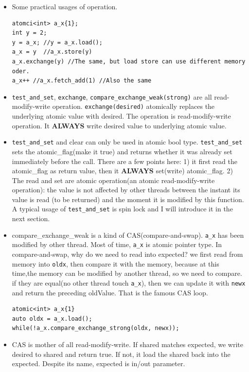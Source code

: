 \documentclass[a4paper,11pt,twoside]{book}
\begin{document}
\begin{itemize}
	\item Some practical usages of operation.
\begin{lstlisting}[numbers=none]
atomci<int> a_x{1};
int y = 2;
y = a_x; //y = a_x.load();
a_x = y  //a_x.store(y) 
a_x.exchange(y) //The same, but load store can use different memory oder.
a_x++ //a_x.fetch_add(1) //Also the same
\end{lstlisting}	

	\item \texttt{test\_and\_set}, \texttt{exchange}, \texttt{compare\_exchange\_weak(strong)} are all read-modify-write operation. \texttt{exchange(desired)} atomically replaces the underlying atomic value with desired. The operation is read-modify-write operation. It \textbf{ALWAYS} write desired value to underlying atomic value. 

	\item \texttt{test\_and\_set} and clear can only be used in atomic bool type.  \texttt{test\_and\_set} sets the atomic\_flag(make it true) and returns whether it was already set immediately before the call. There are a few points here: 1) it first read the atomic\_flag as return value, then it \textbf{ALWAYS} set(write) atomic\_flag. 2) The read and set are atomic operation(an atomic read-modify-write operation): the value is not affected by other threads between the instant its value is read (to be returned) and the moment it is modified by this function. A typical usage of \texttt{test\_and\_set} is spin lock and I will introduce it in the next section.

	\item compare\_exchange\_weak is a kind of CAS(compare-and-swap). \texttt{a\_x} has been modified by other thread. Most of time, \texttt{a\_x} is atomic pointer type. In compare-and-swap, why do we need to read into expected? we first read from memory into \texttt{oldx}, then compare it with the memory, because at this time,the memory can be modified by another thread, so we need to compare. if they are equal(no other thread touch \texttt{a\_x}), then we can update it with \texttt{newx} and return the preceding oldValue. That is the famous CAS loop. 
\begin{lstlisting}[numbers=none]
atomic<int> a_x{1}
auto oldx = a_x.load();
while(!a_x.compare_exchange_strong(oldx, newx));
\end{lstlisting}
	
		\item CAS is mother of all read-modify-write. If shared matches expected, we write desired to shared and return true. If not, it load the shared back into the expected. Despite its name, expected is in/out parameter. 


\end{itemize}
\end{document}
